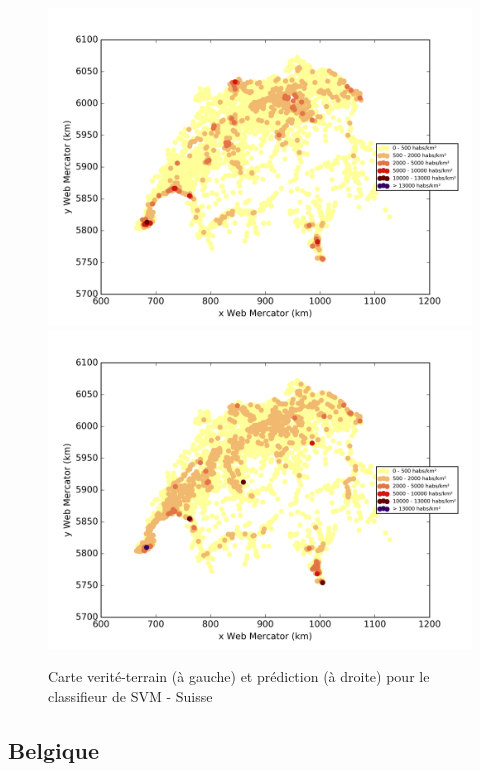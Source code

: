 \documentclass{book}
\begin{document}
\begin{figure}[H]
\centerline{
\includegraphics[scale=0.5]{../../data/Suisse/test/Support_Vector_Gaussian_Classification/Support_Vector_Gaussian_Classification/density_ground_truth.png}
\includegraphics[scale=0.5]{../../data/Suisse/test/Support_Vector_Gaussian_Classification/Support_Vector_Gaussian_Classification/density_classification.png}
}
\caption{Carte verité-terrain (à gauche) et prédiction (à droite) pour le classifieur de SVM - Suisse}
\label{svm_carte_suisse}
\end{figure}

\subsection{Belgique}
\end{document}
